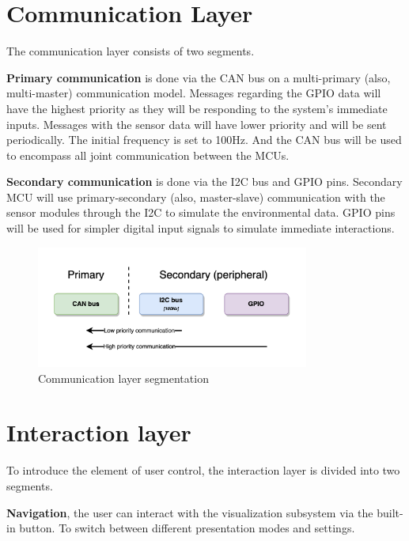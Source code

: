 \section{Communication Layer}\label{sec:communication-model}

The communication layer consists of two segments.

\textbf{Primary communication} is done via the CAN bus on a multi-primary (also, multi-master) communication model.
Messages regarding the GPIO data will have the highest priority as they will be
responding to the system's immediate inputs.
Messages with the sensor data will have lower priority and will be sent periodically.
The initial frequency is set to 100Hz. And the CAN bus will be used to encompass all joint communication between the MCUs.

\textbf{Secondary communication} is done via the I2C bus and GPIO pins.
Secondary MCU will use primary-secondary (also, master-slave) communication with the sensor modules through the I2C to
simulate the environmental data.
GPIO pins will be used for simpler digital input signals to simulate immediate interactions.

\begin{figure}[h]
    \centering
    \includegraphics[width=0.8\textwidth]{images/comms.drawio}
    \caption{Communication layer segmentation}\label{fig:figure-comms}
\end{figure}

\newpage

\section{Interaction layer}\label{sec:user-control}

To introduce the element of user control, the interaction layer is divided into two segments.

\textbf{Navigation}, the user can interact with the visualization subsystem via the built-in button.
To switch between different presentation modes and settings.

